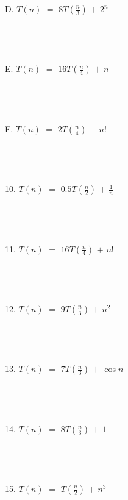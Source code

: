 \documentclass[12pt]{article}
\begin{document}
D. $T(n)$ $=$ $8T(\frac{n}{3})$ $+$ $2^n$\\\\\\\\\\
E. $T(n)$ $=$ $16T(\frac{n}{4})$ $+$ $n$\\\\\\\\\\
\newpage
\noindent F. $T(n)$ $=$ $2T(\frac{n}{4})$ $+$ $n!$\\\\\\\\\\
10. $T(n)$ $=$ $0.5T(\frac{n}{2})$ $+$ $\frac{1}{n}$\\\\\\\\\\
11. $T(n)$ $=$ $16T(\frac{n}{4})$ $+$ $n!$\\\\\\\\\\
12. $T(n)$ $=$ $9T(\frac{n}{3})$ $+$ $n^2$\\\\\\\\\\
13. $T(n)$ $=$ $7T(\frac{n}{3})$ $+$ $\cos{n}$\\\\\\\\\\
14. $T(n)$ $=$ $8T(\frac{n}{3})$ $+$ $1$\\\\\\\\\\
15. $T(n)$ $=$ $T(\frac{n}{2})$ $+$ $n^3$\\\\\\\\\\
\end{document}
